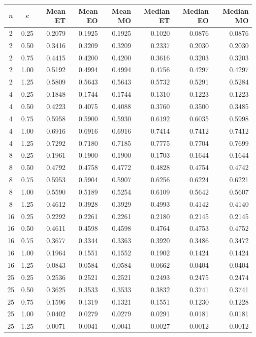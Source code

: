 \begin{tabular}{ccrrrrrr}
\toprule
$n$ & $\kappa$ & Mean ET & Mean EO & Mean MO & Median ET & Median EO & Median MO \\
\midrule
2 & 0.25 & 0.2079 & 0.1925 & 0.1925 & 0.1020 & 0.0876 & 0.0876 \\
2 & 0.50 & 0.3416 & 0.3209 & 0.3209 & 0.2337 & 0.2030 & 0.2030 \\
2 & 0.75 & 0.4415 & 0.4200 & 0.4200 & 0.3616 & 0.3203 & 0.3203 \\
2 & 1.00 & 0.5192 & 0.4994 & 0.4994 & 0.4756 & 0.4297 & 0.4297 \\
2 & 1.25 & 0.5809 & 0.5643 & 0.5643 & 0.5732 & 0.5291 & 0.5284 \\
\midrule
4 & 0.25 & 0.1848 & 0.1744 & 0.1744 & 0.1310 & 0.1223 & 0.1223 \\
4 & 0.50 & 0.4223 & 0.4075 & 0.4088 & 0.3760 & 0.3500 & 0.3485 \\
4 & 0.75 & 0.5958 & 0.5900 & 0.5930 & 0.6192 & 0.6035 & 0.5998 \\
4 & 1.00 & 0.6916 & 0.6916 & 0.6916 & 0.7414 & 0.7412 & 0.7412 \\
4 & 1.25 & 0.7292 & 0.7180 & 0.7185 & 0.7775 & 0.7704 & 0.7699 \\
\midrule
8 & 0.25 & 0.1961 & 0.1900 & 0.1900 & 0.1703 & 0.1644 & 0.1644 \\
8 & 0.50 & 0.4792 & 0.4758 & 0.4772 & 0.4828 & 0.4754 & 0.4742 \\
8 & 0.75 & 0.5953 & 0.5904 & 0.5907 & 0.6256 & 0.6224 & 0.6221 \\
8 & 1.00 & 0.5590 & 0.5189 & 0.5254 & 0.6109 & 0.5642 & 0.5607 \\
8 & 1.25 & 0.4612 & 0.3928 & 0.3929 & 0.4993 & 0.4142 & 0.4140 \\
\midrule
16 & 0.25 & 0.2292 & 0.2261 & 0.2261 & 0.2180 & 0.2145 & 0.2145 \\
16 & 0.50 & 0.4611 & 0.4598 & 0.4598 & 0.4764 & 0.4753 & 0.4752 \\
16 & 0.75 & 0.3677 & 0.3344 & 0.3363 & 0.3920 & 0.3486 & 0.3472 \\
16 & 1.00 & 0.1964 & 0.1551 & 0.1552 & 0.1902 & 0.1424 & 0.1424 \\
16 & 1.25 & 0.0843 & 0.0584 & 0.0584 & 0.0662 & 0.0404 & 0.0404 \\
\midrule
25 & 0.25 & 0.2536 & 0.2521 & 0.2521 & 0.2493 & 0.2475 & 0.2474 \\
25 & 0.50 & 0.3625 & 0.3533 & 0.3533 & 0.3832 & 0.3741 & 0.3741 \\
25 & 0.75 & 0.1596 & 0.1319 & 0.1321 & 0.1551 & 0.1230 & 0.1228 \\
25 & 1.00 & 0.0402 & 0.0279 & 0.0279 & 0.0291 & 0.0181 & 0.0181 \\
25 & 1.25 & 0.0071 & 0.0041 & 0.0041 & 0.0027 & 0.0012 & 0.0012 \\
\bottomrule
\end{tabular}
